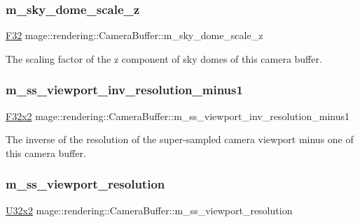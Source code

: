 \subsubsection{\texorpdfstring{m\+\_\+sky\+\_\+dome\+\_\+scale\+\_\+z}{m\_sky\_dome\_scale\_z}}
{\footnotesize\ttfamily \hyperlink{namespacemage_aa97e833b45f06d60a0a9c4fc22ae02c0}{F32} mage\+::rendering\+::\+Camera\+Buffer\+::m\+\_\+sky\+\_\+dome\+\_\+scale\+\_\+z}

The scaling factor of the z component of sky domes of this camera buffer. \hypertarget{structmage_1_1rendering_1_1_camera_buffer_a05e17b19f87ca2a5cb5c75cf04e2796c}{}\label{structmage_1_1rendering_1_1_camera_buffer_a05e17b19f87ca2a5cb5c75cf04e2796c} 
\subsubsection{\texorpdfstring{m\+\_\+ss\+\_\+viewport\+\_\+inv\+\_\+resolution\+\_\+minus1}{m\_ss\_viewport\_inv\_resolution\_minus1}}
{\footnotesize\ttfamily \hyperlink{namespacemage_aa87237ad091f5cd7da612b8523fc108f}{F32x2} mage\+::rendering\+::\+Camera\+Buffer\+::m\+\_\+ss\+\_\+viewport\+\_\+inv\+\_\+resolution\+\_\+minus1}

The inverse of the resolution of the super-\/sampled camera viewport minus one of this camera buffer. \hypertarget{structmage_1_1rendering_1_1_camera_buffer_a96b17352187228ee2265be33d3f2d159}{}\label{structmage_1_1rendering_1_1_camera_buffer_a96b17352187228ee2265be33d3f2d159} 
\subsubsection{\texorpdfstring{m\+\_\+ss\+\_\+viewport\+\_\+resolution}{m\_ss\_viewport\_resolution}}
{\footnotesize\ttfamily \hyperlink{namespacemage_a88e05bff0300120c013285d3dcad95c5}{U32x2} mage\+::rendering\+::\+Camera\+Buffer\+::m\+\_\+ss\+\_\+viewport\+\_\+resolution}

